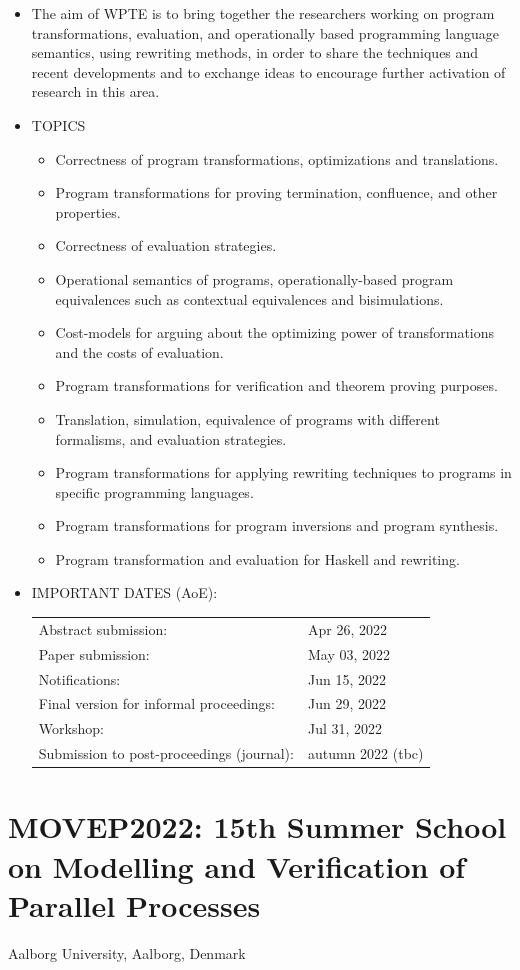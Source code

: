 \documentclass[prodmode,acmtecs]{acmsmall} %
\begin{document}
\begin{itemize}\item  The aim of WPTE is to bring together the researchers working on program transformations, evaluation, and operationally based programming language semantics, using rewriting methods, in order to share the techniques and recent developments and to exchange ideas to encourage further activation of research in this area. 
 
\item  TOPICS 
 
\begin{itemize}\item  Correctness of program transformations, optimizations and translations.
\item  Program transformations for proving termination, confluence, and other properties.
\item  Correctness of evaluation strategies.
\item  Operational semantics of programs, operationally-based program equivalences such as contextual equivalences and bisimulations.
\item  Cost-models for arguing about the optimizing power of transformations and the costs of evaluation.
\item  Program transformations for verification and theorem proving purposes.
\item  Translation, simulation, equivalence of programs with different formalisms, and evaluation strategies.
\item  Program transformations for applying rewriting techniques to programs in specific programming languages.
\item  Program transformations for program inversions and program synthesis.
\item  Program transformation and evaluation for Haskell and rewriting.
\end{itemize} 
\item  IMPORTANT DATES (AoE): 
 
\begin{tabulary}{\linewidth}{LL}Abstract submission:  & Apr 26, 2022 \\
Paper submission:  & May 03, 2022 \\
Notifications:  & Jun 15, 2022 \\
Final version for informal proceedings:  & Jun 29, 2022 \\
Workshop:  & Jul 31, 2022 \\
Submission to post-proceedings (journal):  & autumn 2022 (tbc) \\
\end{tabulary}
 
\end{itemize}\section{MOVEP2022: 15th Summer School on Modelling and Verification of Parallel Processes}\label{MOVEP2022}  Aalborg University, Aalborg, Denmark\\ 
\end{document}
